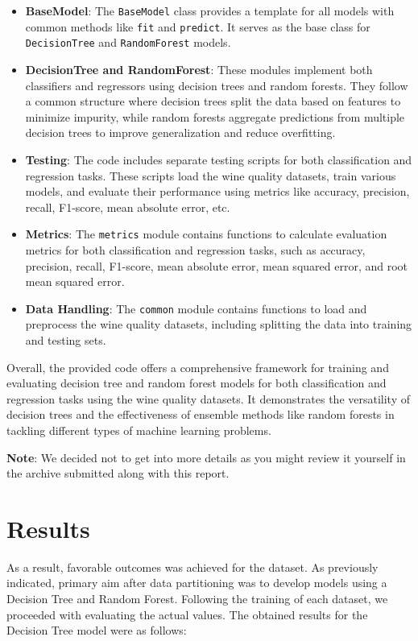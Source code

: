 \documentclass{ufazreport}
\begin{document}
\begin{itemize}
    \item \textbf{BaseModel}: The \texttt{BaseModel} class provides a template for all models with common methods like \texttt{fit} and \texttt{predict}. It serves as the base class for \texttt{DecisionTree} and \texttt{RandomForest} models.
    
    \item \textbf{DecisionTree and RandomForest}: These modules implement both classifiers and regressors using decision trees and random forests. They follow a common structure where decision trees split the data based on features to minimize impurity, while random forests aggregate predictions from multiple decision trees to improve generalization and reduce overfitting.
    
    \item \textbf{Testing}: The code includes separate testing scripts for both classification and regression tasks. These scripts load the wine quality datasets, train various models, and evaluate their performance using metrics like accuracy, precision, recall, F1-score, mean absolute error, etc.
    
    \item \textbf{Metrics}: The \texttt{metrics} module contains functions to calculate evaluation metrics for both classification and regression tasks, such as accuracy, precision, recall, F1-score, mean absolute error, mean squared error, and root mean squared error.
    
    \item \textbf{Data Handling}: The \texttt{common} module contains functions to load and preprocess the wine quality datasets, including splitting the data into training and testing sets.
\end{itemize}

Overall, the provided code offers a comprehensive framework for training and evaluating decision tree and random forest models for both classification and regression tasks using the wine quality datasets. It demonstrates the versatility of decision trees and the effectiveness of ensemble methods like random forests in tackling different types of machine learning problems.

\textbf{Note}: We decided not to get into more details as you might review it yourself in the archive submitted along with this report.




\section{Results}
As a result, favorable outcomes was achieved for the dataset. As previously indicated, primary aim after data partitioning was to develop models using a Decision Tree and Random Forest. Following the training of each dataset, we proceeded with evaluating the actual values. The obtained results for the Decision Tree model were as follows:
\end{document}
